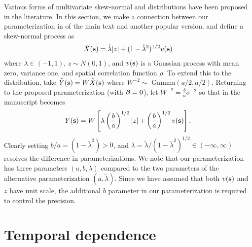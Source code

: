 \label{sta:otherparams}
Various forms of multivariate skew-normal and \skewt{} distributions have been proposed in the literature.
In this section, we make a connection between our parameterization in  of the main text and another popular version.
\citet{Azzalini2014} and \citet{Beranger2016} define a skew-normal process as
\begin{align}
  \tilde{X}(\mathbf{s}) = \tilde{\lambda}|z| + (1 - \tilde{\lambda}^2)^{1 / 2} v(\mathbf{s})
\end{align}
where $\tilde{\lambda} \in (-1, 1)$, $z \sim N(0, 1)$, and $v(\mathbf{s})$ is a Gaussian process with mean zero, variance one, and spatial correlation function $\rho$.
To extend this to the \skewt{} distribution, \citet{Azzalini2003} take $\tilde{Y}(\mathbf{s}) = W\tilde{X}(\mathbf{s})$ where $W^{-2} \sim $ Gamma$(a / 2, a / 2)$.
Returning to the proposed parameterization (with $\mbox{\boldmath $\beta$} = 0$), let $W^{-2} = \frac{b}{a}\sigma^{-2}$ so that  in the manuscript becomes
\begin{align}
  Y(\mathbf{s}) = W \left[ \lambda \left(\frac{b}{a}\right)^{1 / 2} |z| + \left(\frac{b}{a}\right)^{1 / 2} v(\mathbf{s}) \right].
\end{align}
Clearly setting $b / a = (1 - \tilde{\lambda}^2) > 0$, and $\lambda = \tilde{\lambda} / (1 - \tilde{\lambda}^2)^{1 / 2} \in (-\infty, \infty)$ resolves the difference in parameterizations.
We note that our parameterization has three parameters $(a, b, \lambda)$ compared to the two parameters of the alternative parameterization $(a, \tilde{\lambda})$.
Since we have assumed that both $v(\mathbf{s})$ and $z$ have unit scale, the additional $b$ parameter in our parameterization is required to control the precision.

\section{Temporal dependence} \label{sta:temporal}

